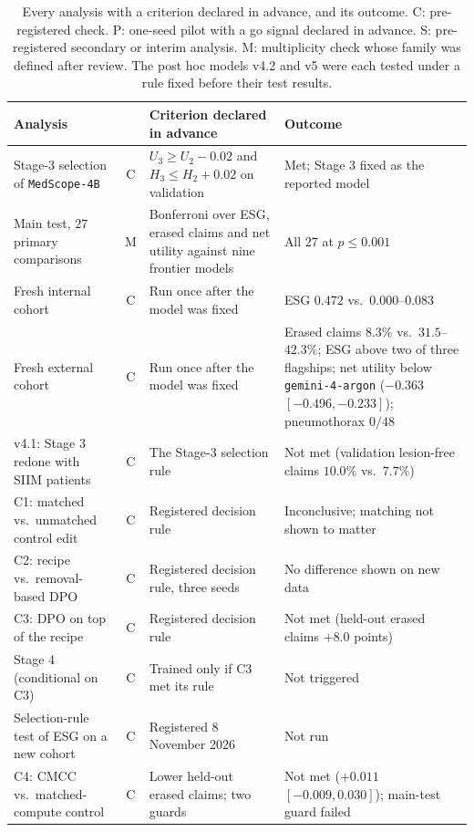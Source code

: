 \documentclass[5p,times,twocolumn,authoryear]{elsarticle}
\begin{document}
\begin{table}[!htbp]
\caption{Every analysis with a criterion declared in advance, and its outcome. C: pre-registered check. P: one-seed pilot with a go signal declared in advance. S: pre-registered secondary or interim analysis. M: multiplicity check whose family was defined after review. The post hoc models v4.2 and v5 were each tested under a rule fixed before their test results.}
\label{tab:registered_outcomes}
\begin{center}
\footnotesize
\renewcommand{\arraystretch}{0.92}
\begin{adjustbox}{max width=\linewidth}
\begin{tabular}{L{4.6cm}cL{5.2cm}L{6.0cm}}
\toprule
\textbf{Analysis} & & \textbf{Criterion declared in advance} & \textbf{Outcome} \\
\midrule
Stage-3 selection of \texttt{MedScope-4B} & C & $U_3 \ge U_2 - 0.02$ and $H_3 \le H_2 + 0.02$ on validation & Met; Stage 3 fixed as the reported model \\
Main test, $27$ primary comparisons & M & Bonferroni over ESG, erased claims and net utility against nine frontier models & All $27$ at $p \le 0.001$ \\
Fresh internal cohort & C & Run once after the model was fixed & ESG $0.472$ vs.\ $0.000$--$0.083$ \\
Fresh external cohort & C & Run once after the model was fixed & Erased claims $8.3\%$ vs.\ $31.5$--$42.3\%$; ESG above two of three flagships; net utility below \texttt{gemini-4-argon} ($-0.363$ $[-0.496, -0.233]$); pneumothorax $0/48$ \\
v4.1: Stage 3 redone with SIIM patients & C & The Stage-3 selection rule & Not met (validation lesion-free claims $10.0\%$ vs.\ $7.7\%$) \\
C1: matched vs.\ unmatched control edit & C & Registered decision rule & Inconclusive; matching not shown to matter \\
C2: recipe vs.\ removal-based DPO & C & Registered decision rule, three seeds & No difference shown on new data \\
C3: DPO on top of the recipe & C & Registered decision rule & Not met (held-out erased claims $+8.0$ points) \\
Stage 4 (conditional on C3) & C & Trained only if C3 met its rule & Not triggered \\
Selection-rule test of ESG on a new cohort & C & Registered 8 November 2026 & Not run \\
C4: CMCC vs.\ matched-compute control & C & Lower held-out erased claims; two guards & Not met ($+0.011$ $[-0.009, 0.030]$); main-test guard failed \\

\end{tabular}
\end{adjustbox}
\end{center}
\end{table}
\end{document}
